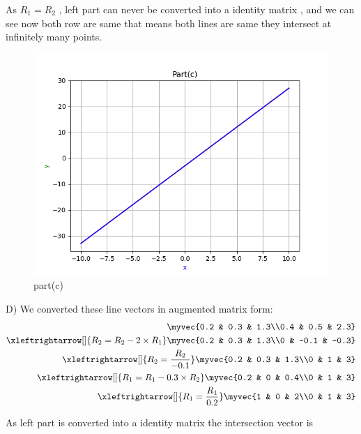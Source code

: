 \begin{enumerate}[label=\thesection.\arabic*.,ref=\thesection.\theenumi]
As $R_{1}=R_{2}$ , left part can never be converted into a identity matrix , and we can see now both row are same that means both lines are same they intersect at infinitely many points.\\

\renewcommand{\thefigure}{\theenumi.\arabic{figure}}
\begin{figure}[!ht]
    \centering
    \includegraphics[width=\columnwidth]{./figures/A1_partc}
\caption{part(c)}
\label{fig: part(c)}
\end{figure}

D)
We converted these line vectors in augmented matrix form:\\ 

\begin{align*}
    \myvec{0.2 & 0.3 & 1.3\\0.4 & 0.5 & 2.3}
\\
    \xleftrightarrow[]{R_{2}=R_{2}-2\times R_{1}} \myvec{0.2 & 0.3 & 1.3\\0 & -0.1 & -0.3}
\\
    \xleftrightarrow[]{R_{2}=\frac{R_{2}}{-0.1}} \myvec{0.2 & 0.3 & 1.3\\0 & 1 & 3}
\\
    \xleftrightarrow[]{R_{1}=R_{1}-0.3 \times R_{2}} \myvec{0.2 & 0 & 0.4\\0 & 1 & 3}
\\
    \xleftrightarrow[]{R_{1}=\frac{R_{1}}{0.2}} \myvec{1 & 0 & 2\\0 & 1 & 3}
\end{align*}

As left part is converted into a identity matrix the intersection vector is \\


\end{enumerate}
